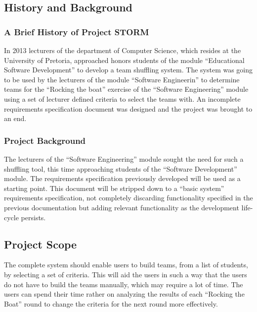 \subsection{History and Background}
\subsubsection{A Brief History of Project STORM}
In 2013 lecturers of the department of Computer Science, which resides at the University of Pretoria,
approached honors students of the module ``Educational Software Development'' to develop a team
shuffling system. 
The system was going to be used by the lecturers of the module ``Software Engineerin'' to
determine teams for the ``Rocking the boat'' exercise of the ``Software Engineering'' module using a
set of lecturer defined criteria to select the teams with. An incomplete requirements specification document
was designed and the project was brought to an end. 

\subsubsection{Project Background}
The lecturers of the ``Software Engineering'' module sought the need for such a shuffling tool, this
time approaching students of the ``Software Development'' module. The requirements specification previously 
developed will be used as a starting point. This document will be stripped down to a ``basic system'' requirements
specification, not completely discarding functionality specified in the previous documentation but adding relevant functionality
as the development life-cycle persists.

\subsection{Project Scope}
The complete system should enable users to build teams, from a list of students, by selecting a
set of criteria. This will aid the users in such a way that the users do not have to build the teams
manually, which may require a lot of time. The users can spend their time rather on analyzing
the results of each ``Rocking the Boat'' round to change the criteria for the next round more
effectively.
